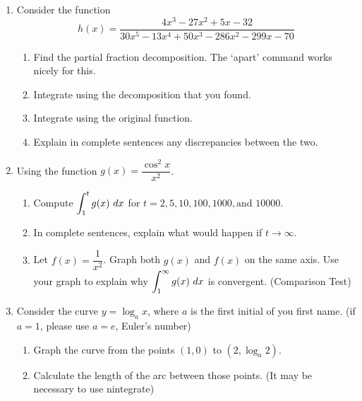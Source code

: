 \documentclass[11pt]{article}
\begin{document}
\begin{enumerate}
\item Consider the function
\[
h(x)=\frac{4x^3-27x^2+5x-32}{30x^5-13x^4+50x^3-286x^2-299x-70}
\]
\begin{enumerate}
\item Find the partial fraction decomposition.  The `apart' command works nicely for this.
\item Integrate using the decomposition that you found.
\item Integrate using the original function.
\item Explain in complete sentences any discrepancies between the two.
\end{enumerate}
\item Using the function $g(x)=\dfrac{\cos^2x}{x^2}$.
\begin{enumerate}
\item Compute $\displaystyle \int_1^t g(x)\ dx$ for $t=2,5,10,100,1000, \text{and } 10000$.
\item In complete sentences, explain what would happen if $t\to\infty$. 
\item Let $f(x)=\dfrac1{x^2}$. Graph both $g(x)$ and $f(x)$ on the same axis.  Use your graph to explain why $\displaystyle \int_1^\infty g(x)\ dx $ is convergent. (Comparison Test)
\end{enumerate}
\item Consider the curve $y=\log_a x$, where $a$ is the first initial of you first name.  (if $a=1$, please use $a=e$, Euler's number)
\begin{enumerate}
\item Graph the curve from the points $(1,0)$ to $(2,\log_a2)$.
\item Calculate the length of the arc between those points.  (It may be necessary to use nintegrate) 
\end{enumerate}
\end{enumerate}
\end{document}
